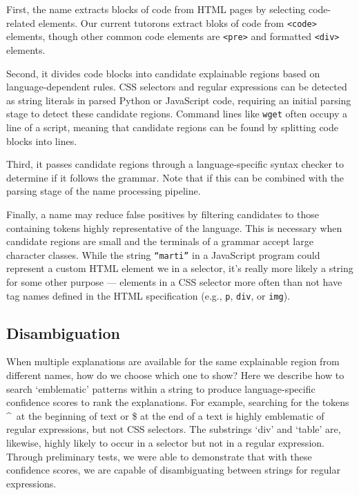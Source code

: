 First, the \gls{name} extracts blocks of code from HTML pages by selecting code-related elements.
Our current tutorons extract bloks of code from \texttt{<code>} elements, though other common code elements are \texttt{<pre>} and formatted \texttt{<div>} elements.

Second, it divides code blocks into candidate explainable regions based on language-dependent rules.
CSS selectors and regular expressions can be detected as string literals in parsed Python or JavaScript code, requiring an initial parsing stage to detect these candidate regions.
Command lines like \texttt{wget} often occupy a line of a script, meaning that candidate regions can be found by splitting code blocks into lines.

Third, it passes candidate regions through a language-specific syntax checker to determine if it follows the grammar.
Note that if this can be combined with the parsing stage of the \gls{name} processing pipeline.

Finally, a \gls{name} may reduce false positives by filtering candidates to those containing tokens highly representative of the language.
This is necessary when candidate regions are small and the terminals of a grammar accept large character classes.
While the string \texttt{``marti''} in a JavaScript program could represent a custom HTML element we in a selector, it's really more likely a string for some other purpose --- elements in a CSS selector more often than not have tag names defined in the HTML specification (e.g., \texttt{p}, \texttt{div}, or \texttt{img}).
%
\begin{changes}
\subsection{Disambiguation}
When multiple explanations are available for the same explainable region from different \glspl{name}, how do we choose which one to show?
Here we describe how to search `emblematic' patterns within a string to produce language-specific confidence scores to rank the explanations.
For example, searching for the tokens \textasciicircum\ at the beginning of text or \$ at the end of a text is highly emblematic of regular expressions, but not CSS selectors.
The substrings `div' and `table' are, likewise, highly likely to occur in a selector but not in a regular expression.
Through preliminary tests, we were able to demonstrate that with these confidence scores, we are capable of disambiguating between strings for regular expressions.
\end{changes}

